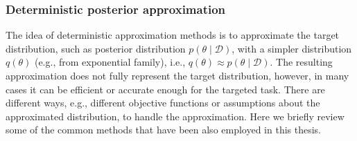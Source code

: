 \documentclass[dissertation,math,vertlayout,pdfa,colorlinks]{aaltoseries}
\newcommand{\bD}{\mathcal{D}}
\begin{document}
\subsubsection{Deterministic posterior approximation}

The idea of deterministic approximation methods is to approximate the target distribution, such as posterior distribution $p(\theta \mid \bD)$, with a simpler distribution $q(\theta)$ (e.g., from exponential family), i.e., $q(\theta) \approx p(\theta \mid \bD)$. The resulting approximation does not fully represent the target distribution, however, in many cases it can be efficient or accurate enough for the targeted task. There are different ways, e.g., different objective functions or assumptions about the approximated distribution, to handle the approximation. Here we briefly review some of the common methods that have been also employed in this thesis. 
\end{document}
